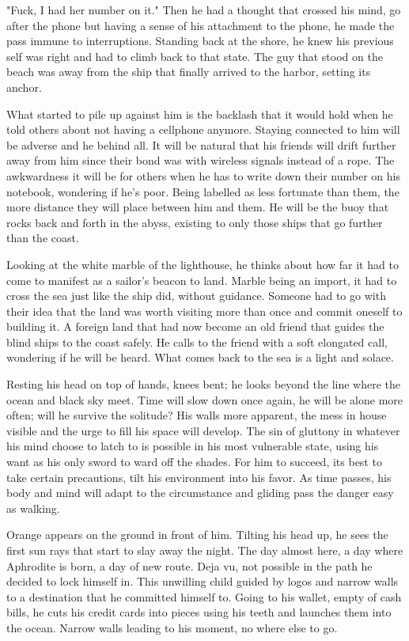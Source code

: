 \begin{Document}
        "Fuck, I had her number on it." Then he had a thought that crossed his mind, go after the phone but having a sense of his attachment to the phone, he
    made the pass immune to interruptions. Standing back at the shore, he knew his previous self was right and had to climb back to that state. The guy that
    stood on the beach was away from the ship that finally arrived to the harbor, setting its anchor.

        What started to pile up against him is the backlash that it would hold when he told others about not having a cellphone anymore. Staying connected to
    him will be adverse and he behind all. It will be natural that his friends will drift further away from him since their bond was with wireless signals
    instead of a rope. The awkwardness it will be for others when he has to write down their number on his notebook, wondering if he's poor. Being labelled as
    less fortunate than them, the more distance they will place between him and them. He will be the buoy that rocks back and forth in the abyss, existing
    to only those ships that go further than the coast.

        Looking at the white marble of the lighthouse, he thinks about how far it had to come to manifest as a sailor's beacon to land. Marble being an import,
    it had to cross the sea just like the ship did, without guidance. Someone had to go with their idea that the land was worth visiting more than once and
    commit oneself to building it. A foreign land that had now become an old friend that guides the blind ships to the coast safely. He calls to the friend with
    a soft elongated call, wondering if he will be heard. What comes back to the sea is a light and solace.

       Resting his head on top of hands, knees bent; he looks beyond the line where the ocean and black sky meet. Time will slow down once again, he will
    be alone more often; will he survive the solitude? His walls more apparent, the mess in house visible and the urge to fill his space will develop. 
    The sin of gluttony in whatever his mind choose to latch to is possible in his most vulnerable state, using his want as his only sword to ward off the
    shades. For him to succeed, its best to take certain precautions, tilt his environment into his favor. As time passes, his body and mind will adapt to
    the circumstance and gliding pass the danger easy as walking.

        Orange appears on the ground in front of him. Tilting his head up, he sees the first sun rays that start to slay away the night. The day almost here, a
    day where Aphrodite is born, a day of new route. Deja vu, not possible in the path he decided to lock himself in. This unwilling child guided by logos and
    narrow walls to a destination that he committed himself to. Going to his wallet, empty of cash bills, he cuts his credit cards into pieces using his teeth
    and launches them into the ocean. Narrow walls leading to his moment, no where else to go.
\end{Document}
